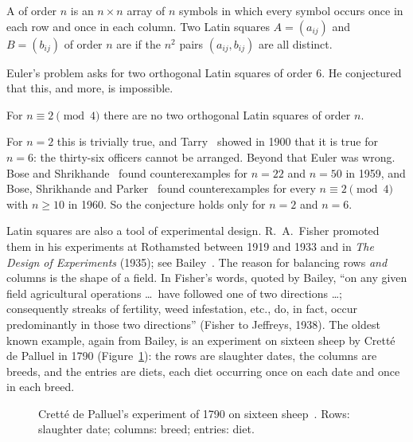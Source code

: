 \begin{definition}\label{def:latin}
A  of order $n$ is an $n\times n$ array of $n$ symbols in which every symbol occurs once in each row and once in each column. Two Latin squares $A=(a_{ij})$ and $B=(b_{ij})$ of order $n$ are  if the $n^2$ pairs $(a_{ij},b_{ij})$ are all distinct.
\end{definition}

Euler's problem asks for two orthogonal Latin squares of order $6$. He conjectured that this, and more, is impossible.

\begin{conjecture}[Euler, 1782]\label{conj:euler}
For $n\equiv2\pmod4$ there are no two orthogonal Latin squares of order $n$.
\end{conjecture}

For $n=2$ this is trivially true, and Tarry~\cite{tar1900} showed in 1900 that it is true for $n=6$: the thirty-six officers cannot be arranged. Beyond that Euler was wrong. Bose and Shrikhande~\cite{bs59} found counterexamples for $n=22$ and $n=50$ in 1959, and Bose, Shrikhande and Parker~\cite{bsp60} found counterexamples for every $n\equiv2\pmod4$ with $n\geq10$ in 1960. So the conjecture holds only for $n=2$ and $n=6$.


Latin squares are also a tool of experimental design. R.~A.~Fisher promoted them in his experiments at Rothamsted between 1919 and 1933 and in \emph{The Design of Experiments} (1935); see Bailey~\cite{bai13}. The reason for balancing rows \emph{and} columns is the shape of a field. In Fisher's words, quoted by Bailey, ``on any given field agricultural operations \dots\ have followed one of two directions \dots; consequently streaks of fertility, weed infestation, etc., do, in fact, occur predominantly in those two directions'' (Fisher to Jeffreys, 1938). The oldest known example, again from Bailey, is an experiment on sixteen sheep by Cretté de Palluel in 1790 (Figure~\ref{fig:sheep}): the rows are slaughter dates, the columns are breeds, and the entries are diets, each diet occurring once on each date and once in each breed.

\begin{figure}[ht]
\centering

\caption{Cretté de Palluel's experiment of 1790 on sixteen sheep~\cite{bai13}. Rows: slaughter date; columns: breed; entries: diet.}
\label{fig:sheep}
\end{figure}

